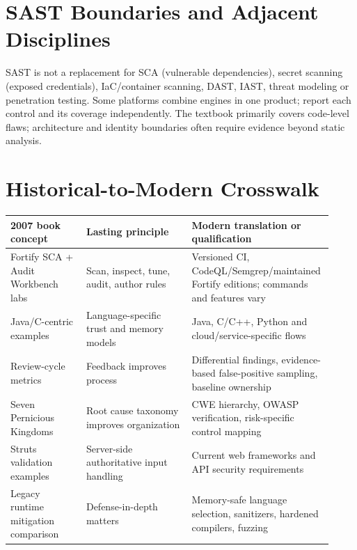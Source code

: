 \documentclass[10pt,letterpaper]{article}
\begin{document}
\section{SAST Boundaries and Adjacent Disciplines}
SAST is not a replacement for SCA (vulnerable dependencies), secret scanning (exposed credentials), IaC/container scanning, DAST, IAST, threat modeling or penetration testing. Some platforms combine engines in one product; report each control and its coverage independently. The textbook primarily covers code-level flaws; architecture and identity boundaries often require evidence beyond static analysis.
\section{Historical-to-Modern Crosswalk}
\begin{longtable}{@{}p{0.23\linewidth}p{0.32\linewidth}p{0.37\linewidth}@{}}\toprule
2007 book concept & Lasting principle & Modern translation or qualification\\\midrule\endhead
Fortify SCA + Audit Workbench labs & Scan, inspect, tune, audit, author rules & Versioned CI, CodeQL/Semgrep/maintained Fortify editions; commands and features vary\\
Java/C-centric examples & Language-specific trust and memory models & Java, C/C++, Python and cloud/service-specific flows\\
Review-cycle metrics & Feedback improves process & Differential findings, evidence-based false-positive sampling, baseline ownership\\
Seven Pernicious Kingdoms & Root cause taxonomy improves organization & CWE hierarchy, OWASP verification, risk-specific control mapping\\
Struts validation examples & Server-side authoritative input handling & Current web frameworks and API security requirements\\
Legacy runtime mitigation comparison & Defense-in-depth matters & Memory-safe language selection, sanitizers, hardened compilers, fuzzing\\\bottomrule
\end{longtable}
\end{document}
